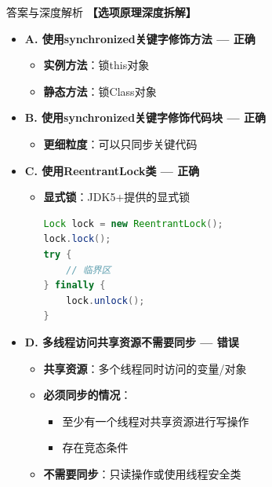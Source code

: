\documentclass[12pt, a4paper]{ctexart}
\begin{document}
\begin{enumerate}[label=\textbf{\arabic*.}]
\begin{bluebox}{答案与深度解析}
		      \textbf{【选项原理深度拆解】}
					  \begin{itemize}[label={}, leftmargin=*, nosep]

		      \item \textbf{A. 使用synchronized关键字修饰方法 — 正确}
		      \begin{itemize}[label={}, leftmargin=*, nosep]
			      \item \textbf{实例方法}：锁this对象
			      \item \textbf{静态方法}：锁Class对象
		      \end{itemize}

		      \item \textbf{B. 使用synchronized关键字修饰代码块 — 正确}
		      \begin{itemize}[label={}, leftmargin=*, nosep]
			      \item \textbf{更细粒度}：可以只同步关键代码
		      \end{itemize}

		      \item \textbf{C. 使用ReentrantLock类 — 正确}
		      \begin{itemize}[label={}, leftmargin=*, nosep]
			      \item \textbf{显式锁}：JDK5+提供的显式锁
			            \begin{lstlisting}[language=Java]
Lock lock = new ReentrantLock();
lock.lock();
try {
    // 临界区
} finally {
    lock.unlock();
}
      \end{lstlisting}
		      \end{itemize}

		      \item \textbf{D. 多线程访问共享资源不需要同步 — 错误}
		      \begin{itemize}[label={}, leftmargin=*, nosep]
			      \item \textbf{共享资源}：多个线程同时访问的变量/对象
			      \item \textbf{必须同步的情况}：
			            \begin{itemize}[label={}, nosep]
				            \item 至少有一个线程对共享资源进行写操作
				            \item 存在竞态条件
			            \end{itemize}
			      \item \textbf{不需要同步}：只读操作或使用线程安全类
		      \end{itemize}


\end{itemize}
\end{bluebox}
\end{enumerate}
\end{document}
